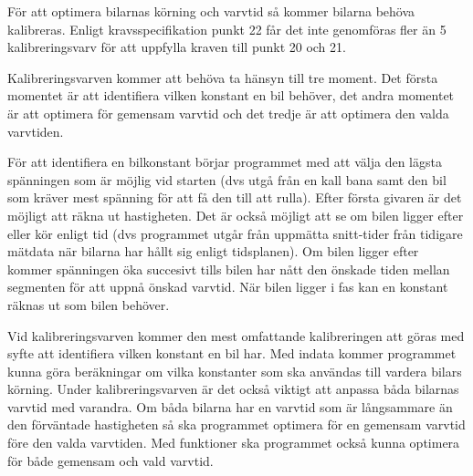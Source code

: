 För att optimera bilarnas körning och varvtid så kommer bilarna behöva
kalibreras. Enligt kravsspecifikation punkt 22 får det inte genomföras fler än
5 kalibreringsvarv för att uppfylla kraven till punkt 20 och 21.

Kalibreringsvarven kommer att behöva ta hänsyn till tre moment. Det första momentet är att
identifiera vilken konstant en bil behöver, det andra momentet är att optimera för
gemensam varvtid och det tredje är att optimera den valda varvtiden.


För att identifiera en bilkonstant börjar programmet med att välja den lägsta spänningen som är möjlig vid starten (dvs utgå från en kall bana samt den bil som kräver mest spänning för att få den till att rulla). Efter första givaren är det möjligt att räkna ut hastigheten. Det är också möjligt att se om bilen ligger efter eller kör enligt tid (dvs programmet utgår från uppmätta snitt-tider från tidigare mätdata när bilarna har hållt sig enligt tidsplanen). Om bilen ligger efter kommer spänningen öka succesivt tills bilen har nått den önskade tiden mellan segmenten för att uppnå önskad varvtid. När bilen ligger i fas kan en konstant räknas ut som bilen behöver.


 Vid
kalibreringsvarven kommer den mest omfattande kalibreringen att göras med syfte att identifiera
vilken konstant en bil har. Med indata kommer programmet kunna göra beräkningar
om vilka konstanter som ska användas till vardera bilars körning. Under
kalibreringsvarven är det också viktigt att anpassa båda bilarnas varvtid med
varandra. Om båda bilarna har en varvtid som är långsammare än den förväntade
hastigheten så ska programmet optimera för en gemensam varvtid före den valda
varvtiden. Med funktioner ska programmet också kunna optimera för både
gemensam och vald varvtid.


